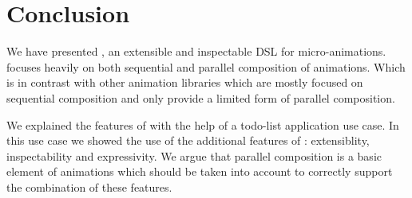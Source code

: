 \section{Conclusion}
\label{sec:conclusion}

We have presented \dsl{}, an extensible and inspectable DSL for micro-animations. \dsl{} focuses heavily on both sequential and parallel composition of animations. Which is in contrast with other animation libraries which are mostly focused on sequential composition and only provide a limited form of parallel composition.

We explained the features of \dsl{} with the help of a todo-list application use case. In this use case we showed the use of the additional features of \dsl{}: extensiblity, inspectability and expressivity. We argue that parallel composition is a basic element of animations which should be taken into account to correctly support the combination of these features.
